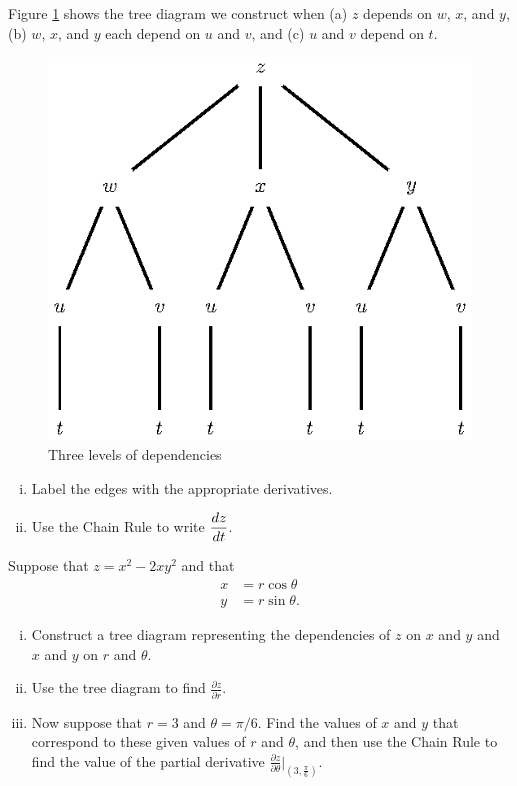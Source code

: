 \begin{activity} \label{PA:10.13} 
\ba
\item Figure \ref{F:10.5.tree.2} shows the tree diagram we construct when (a) $z$ depends on $w$, $x$, and $y$, (b) $w$, $x$, and $y$ each depend on $u$ and $v$, and (c) $u$ and $v$ depend on $t$.

\begin{figure}[ht]
  \begin{center}
    \includegraphics{figures/fig_10_5_tree_2.eps}
  \end{center}
  \caption{Three levels of dependencies}
  \label{F:10.5.tree.2}
\end{figure}

\begin{enumerate}[i.]
  \item Label the edges with the appropriate derivatives.
  \item Use the Chain Rule to write $\displaystyle\frac{dz}{dt}$.
\end{enumerate}

\item Suppose that $z=x^2 - 2xy^2$ and that 
    \begin{align*}
      x&=r\cos\theta \\
      y&=r\sin\theta.
    \end{align*}
    \begin{enumerate}[i.]
	\item Construct a tree diagram representing the dependencies of $z$ on $x$ and $y$ and $x$ and $y$ on $r$ and $\theta$. 
	\item Use the tree diagram to find $\frac{\partial z}{\partial r}$. 
	\item Now suppose that $r = 3$ and $\theta=\pi/6$. Find the values of $x$ and $y$ that correspond to these given values of $r$ and $\theta$, and then use the Chain Rule to find the value of the partial derivative $\frac{\partial z}{\partial \theta}|_{(3,\frac{\pi}{6})}$.
    \end{enumerate}
    
  \ea

\end{activity} 

